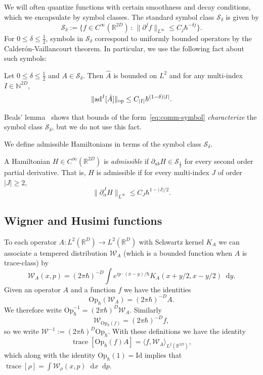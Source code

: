 \documentclass[11pt]{amsart}
\def\Wigner{{\mathcal W}}
\def\bbN{{\mathbb{N}}}
\def\Op{\mathrm{Op}}
\def\trace{\operatorname*{trace}}
\def\Id{\mathrm{Id}}
\def\ad{\mathrm{ad}}
\def\Real{{\mathbb R}}
\newcommand{\diff}{\mathop{}\!\mathrm{d}}
\newcommand{\mcal}[1]{{\mathcal{#1}}}
\numberwithin{equation}{section}
\begin{document}
We will often quantize functions with certain smoothness and decay conditions, which we encapsulate by symbol classes.  The standard
symbol class $\mcal{S}_\delta$ is given by
\begin{equation}
    \label{eq:Sdef}
    \mcal{S}_\delta := \{f\in C^\infty(\Real^{2D}) \,:\, \|\partial^j f\|_{L^\infty} \leq C_j \hbar^{-\delta j}\}.
\end{equation}
For $0\leq \delta\leq \frac12$, symbols in $\mcal{S}_\delta$ correspond to uniformly bounded operators by the Calder\'on-Vaillancourt theorem.
In particular, we use the following fact about such symbols:
\begin{proposition}
\label{prp:comm-ests}
Let $0\leq \delta\leq \frac12$ and $A\in\mcal{S}_\delta$.  Then $\hat{A}$ is bounded on $L^2$ and for any multi-index $I\in\bbN^{2D}$,
\begin{equation}
\label{eq:comm-symbol}
\|\ad^I [\hat{A}]\|_{\rm op} \leq C_{|I|} \hbar^{(1-\delta)|I|}.
\end{equation}
\end{proposition}
Beals' lemma~\cite[Theorem 8.3]{zworski} shows that bounds of the form~\eqref{eq:comm-symbol} \textit{characterize} the symbol class $\mcal{S}_\delta$,
but we do not use this fact.

We define admissible Hamiltonians in terms of the symbol class $\mcal{S}_\delta$.
\begin{definition}
\label{def:admissibleH}
A Hamiltonian $H\in C^\infty(\Real^{2D})$ is \textit{admissible}
if $\partial_{ab} H \in \mcal{S}_{\frac12}$ for every second order partial derivative.  That is, $H$ is
admissible if for every multi-index $J$ of order $|J|\geq2$,
\[
\|\partial_\alpha^J H\|_{L^\infty} \leq C_J \hbar^{1-|J|/2}.
\]
\end{definition}

\subsection{Wigner and Husimi functions}
\label{sec:husimi}
 To each operator $A:L^2(\Real^D) \to L^2(\Real^D)$ with Schwartz kernel $K_A$ we can associate a tempered distribution $\Wigner_A$ (which is a bounded function when $A$ is trace-class) by
\[
\Wigner_A(x,p) = (2\pi\hbar)^{-D} \int e^{i p \cdot(x-y)/\hbar}  K_A(x+y/2,x-y/2)  \diff y.
\]
Given an operator $A$ and a function $f$ we have the identities
\[
\Op_\hbar(\Wigner_A) = (2\pi \hbar)^{-D} A.
\]
We therefore write $\Op_\hbar^{-1} = (2\pi \hbar)^D \Wigner_A$.  Similarly
\[
\Wigner_{\Op_\hbar(f)} = (2\pi\hbar)^{-D} f,
\]
so we write $\Wigner^{-1} := (2\pi\hbar)^D \Op_\hbar$.  With these definitions we have the identity
\begin{equation}
\label{eq:wigner-weyl}
\trace[\Op_\hbar(f) A] = \langle f, \Wigner_A\rangle_{L^2(\Real^{2D})},
\end{equation}
which along with the identity $\Op_\hbar(1) = \Id$ implies that $\trace[\rho] = \int \Wigner_\rho(x,p)\diff x\diff p$.
\end{document}

